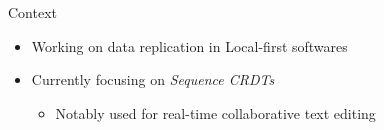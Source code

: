 \documentclass[10pt]{beamer}
\begin{document}




\begin{frame}{Context}
  \begin{itemize}
    \item Working on data replication in Local-first softwares 
    \item Currently focusing on \emph{Sequence \acp{CRDT}}
    \begin{itemize}
      \item Notably used for real-time collaborative text editing
    \end{itemize}
  \end{itemize}
\end{frame}
\end{document}
